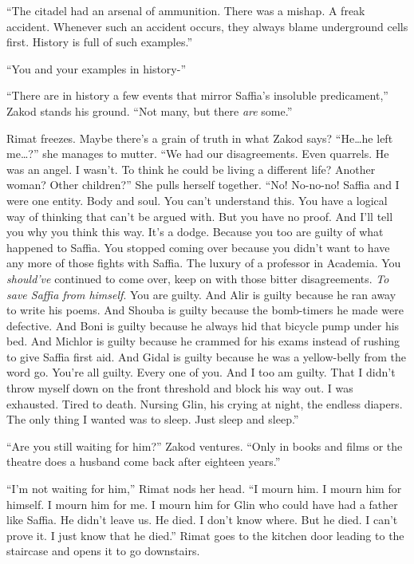 \documentclass[twoside,11pt,openany]{book}
\begin{document}
``The citadel had an arsenal of ammunition. There was a mishap. A freak accident. Whenever such an accident
occurs, they always blame underground cells first. History is full of such examples.''

``You and your examples in history-''

``There are in history a few events that mirror Saffia's insoluble predicament,'' Zakod stands
his ground. ``Not many, but there \textit{are} some.''

Rimat freezes. Maybe there's a grain of truth in what Zakod says?
``He{\ldots}he left me{\ldots}?'' she
manages to mutter. ``We had our disagreements. Even quarrels. He was an angel. I wasn't. To think he could be living a
different life? Another woman? Other children?'' She pulls herself together. ``No! No-no-no!
Saffia and I were one entity. Body and soul.  You can't understand this. You have a logical way of thinking that can't
be argued with. But you have no proof. And I'll tell you why you think this way. It's a dodge. Because you too are
guilty of what happened to Saffia. You stopped coming over because you didn't want to have any more of those fights
with Saffia. The luxury of a professor in Academia. You \textit{should've} continued to come over, keep on with those
bitter disagreements. \textit{To save Saffia from himself}. You are guilty. And Alir is guilty because he ran away to
write his poems. And Shouba is guilty because the bomb-timers he made were defective. And Boni is guilty because he
always hid that bicycle pump under his bed. And Michlor is guilty because he crammed for his exams instead of rushing
to give Saffia first aid. And Gidal is guilty because he was a yellow-belly from the word go.  You're all guilty.
Every one of you. And I too am guilty. That I didn't throw myself down on the front threshold and block his way out. I
was exhausted. Tired to death. Nursing Glin, his crying at night, the endless diapers. The only thing I wanted was to
sleep. Just sleep and sleep.''

``Are you still waiting for him?'' Zakod ventures. ``Only in books and films or
the theatre does a husband come back after eighteen years.''

``I'm not waiting for him,'' Rimat nods her head. ``I mourn him. I mourn him for
himself. I mourn him for me. I mourn him for Glin who could have had a father like Saffia. He didn't leave us. He died.
I don't know where. But he died. I can't prove it. I just know that he died.'' Rimat goes to the kitchen
door leading to the staircase and opens it to go downstairs.
\end{document}
